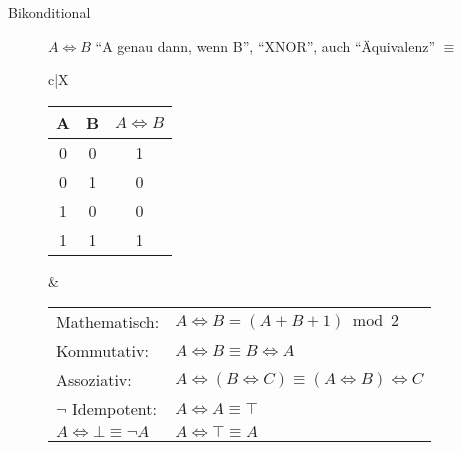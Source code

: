 \begin{description}
\begin{description}
        \item[Bikonditional] $A \Leftrightarrow B$ ``A genau dann, wenn B'', ``XNOR'', auch ``Äquivalenz'' $\equiv$ \\
        \begin{tabularx}{\linewidth}{c|X}
            \begin{tabular}[t]{c | c || c}
                A & B & $A \Leftrightarrow B$ \\ \hline\hline
                0 & 0 & 1                     \\ \hline
                0 & 1 & 0                     \\ \hline
                1 & 0 & 0                     \\ \hline
                1 & 1 & 1
            \end{tabular} &
            \begin{tabular}[t]{ll}
                Mathematisch:                          & $A \Leftrightarrow B = (A + B + 1)\bmod 2$                                               \\
                Kommutativ:                            & $A \Leftrightarrow B \equiv B \Leftrightarrow A$                                         \\
                Assoziativ:                            & $A \Leftrightarrow (B \Leftrightarrow C) \equiv (A \Leftrightarrow B) \Leftrightarrow C$ \\
                $\neg$ Idempotent:                     & $A \Leftrightarrow A \equiv \top$                                                        \\
                $A \Leftrightarrow \bot \equiv \neg A$ & $A \Leftrightarrow \top \equiv A$
            \end{tabular} \\ \hline
        \end{tabularx}
    \end{description}
\end{description}
